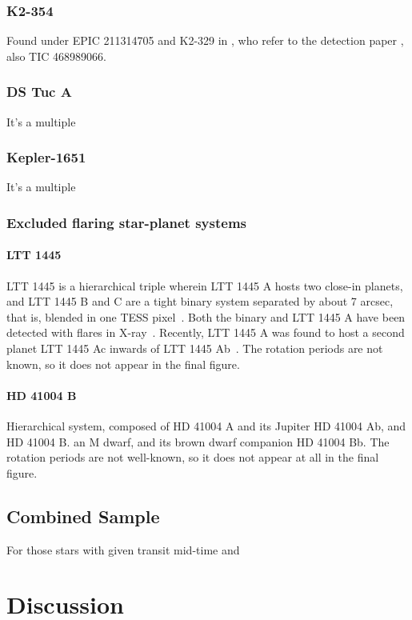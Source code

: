 \documentclass[twocolumn]{aastex631}
\begin{document}
\subsubsection{K2-354}
Found under EPIC 211314705 and K2-329 in \cite{bouma2020cluster}, who refer to the detection paper \cite{pope2016transiting}, also TIC 468989066.

\subsubsection{DS Tuc A}
It's a multiple
\subsubsection{Kepler-1651}
It's a multiple


\subsubsection{Excluded flaring star-planet systems}
\paragraph{LTT 1445}
 LTT 1445 is a hierarchical triple wherein LTT 1445 A hosts two close-in planets, and LTT 1445 B and C are a tight binary system separated by about 7 arcsec, that is, blended in one TESS pixel~\citep{winters2019three}. Both the binary and LTT 1445 A have been detected with flares in X-ray~\citep{brown2022xray}. Recently, LTT 1445 A was found to host a second planet LTT 1445 Ac inwards of LTT 1445 Ab~\citep{lavie2022planetary}. The rotation periods are not known, so it does not appear in the final figure.

\paragraph{HD 41004 B}
Hierarchical system, composed of HD 41004 A and its Jupiter HD 41004 Ab, and HD 41004 B. an M dwarf, and its brown dwarf companion HD 41004 Bb. The rotation periods are not well-known, so it does not appear at all in the final figure.


\subsection{Combined Sample}

For those stars with given transit mid-time and 
\section{Discussion}
\label{sec:discussion}
\end{document}
